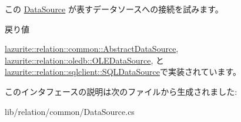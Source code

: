 この \hyperlink{interfacelazurite_1_1relation_1_1common_1_1_data_source}{DataSource} が表すデータソースへの接続を試みます。 \begin{DoxyReturn}{戻り値}

\end{DoxyReturn}


\hyperlink{classlazurite_1_1relation_1_1common_1_1_abstract_data_source_a1706b5b8821b00ad2391dd0fcf98a767}{lazurite::relation::common::AbstractDataSource}, \hyperlink{classlazurite_1_1relation_1_1oledb_1_1_o_l_e_data_source_a7dbd44842590d2d1f11a6ddca7a393b7}{lazurite::relation::oledb::OLEDataSource}, と \hyperlink{classlazurite_1_1relation_1_1sqlclient_1_1_s_q_l_data_source_a99a7bdaa7ca6fce82a89f537a72b2e23}{lazurite::relation::sqlclient::SQLDataSource}で実装されています。

このインタフェースの説明は次のファイルから生成されました:\begin{DoxyCompactItemize}
\item 
lib/relation/common/DataSource.cs\end{DoxyCompactItemize}
